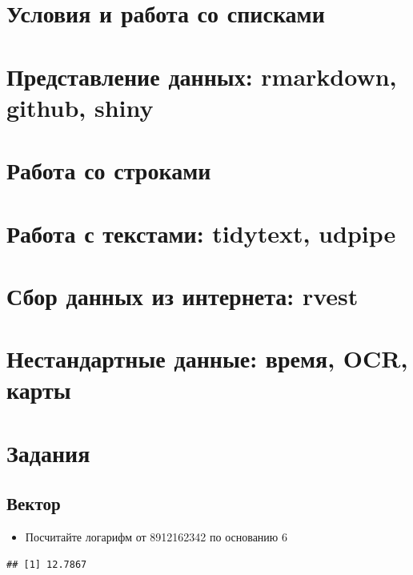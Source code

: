 \documentclass[]{book}
\providecommand{\tightlist}{%
  \setlength{\itemsep}{0pt}\setlength{\parskip}{0pt}}
\begin{document}
\hypertarget{dplyr_purr}{%
\chapter{Условия и работа со списками}\label{dplyr_purr}}

\hypertarget{data_presentation}{%
\chapter{Представление данных: rmarkdown, github, shiny}\label{data_presentation}}

\hypertarget{strings}{%
\chapter{Работа со строками}\label{strings}}

\hypertarget{tidytext}{%
\chapter{Работа с текстами: tidytext, udpipe}\label{tidytext}}

\hypertarget{rvest}{%
\chapter{Сбор данных из интернета: rvest}\label{rvest}}

\hypertarget{non_standard_data}{%
\chapter{Нестандартные данные: время, OCR, карты}\label{non_standard_data}}

\hypertarget{tasks}{%
\chapter{Задания}\label{tasks}}

\hypertarget{vec_task_1}{%
\section{Вектор}\label{vec_task_1}}

\begin{itemize}
\tightlist
\item
  Посчитайте логарифм от 8912162342 по основанию 6
\end{itemize}

\begin{verbatim}
## [1] 12.7867
\end{verbatim}
\end{document}
